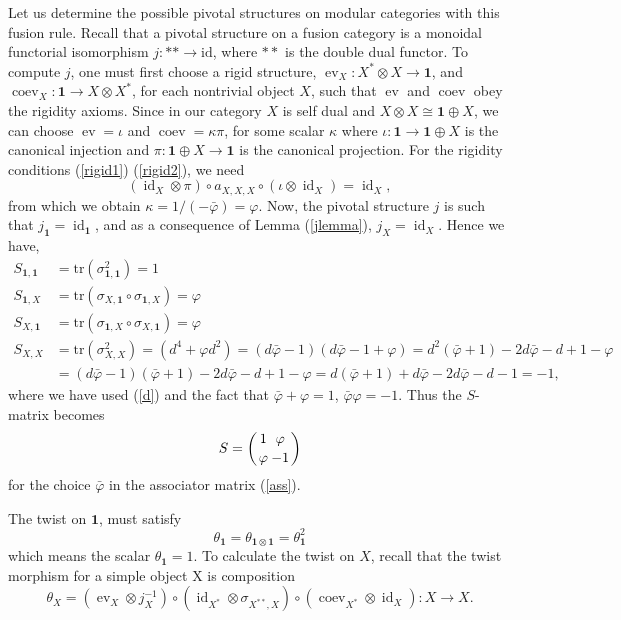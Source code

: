 \documentclass[11pt]{book}
\theoremstyle{Rem}
\theoremstyle{definition}
\numberwithin{equation}{section}
\newcommand{\tmt}[4]{\left({#1\atop #3}{#2\atop #4}\right)}
\newcommand\inv{^{-1}}
\newcommand\id{\operatorname{id}}
\newcommand\one{\mathbf{1}}
\newcommand\ev{\operatorname{ev}}
\newcommand\coev{\operatorname{coev}}
\begin{document}
Let us determine the possible pivotal structures on modular categories with this fusion rule. Recall that a pivotal structure on a fusion category is a monoidal functorial isomorphism $j: **\rightarrow\text{id}$, where $**$ is the double dual functor. To compute $j$, one must first choose a rigid structure, $\ev_X:X^*\otimes X\rightarrow \one$, and $\coev_X:\one\rightarrow X\otimes X^*$, for each nontrivial object $X$, such that $\ev$ and $\coev$ obey the rigidity axioms. Since in our category $X$ is self dual and $X\otimes X \cong \one \oplus X$, we can choose $\ev= \iota$ and $\coev=\kappa\pi$, for some scalar $\kappa$ where $\iota:\one\rightarrow\one\oplus X$ is the canonical injection and  $\pi: \one\oplus X\rightarrow \one$ is the canonical projection.
For the rigidity conditions (\ref{rigid1}) (\ref{rigid2}), we need
\begin{equation}
	(\id_X \otimes \pi) \circ a_{X, X, X}\circ(\iota \otimes \id_X) = \id_X,
\end{equation}
from which we obtain $\kappa=1/(-\bar{\varphi}) = \varphi$.
Now, the pivotal structure $j$ is such that $j_\one =\id_\one$, and as a consequence of Lemma (\ref{jlemma}), $j_X = \id_X$. 
Hence we have, \begin{align}
	S_{\one,\one} &= \text{tr}(\sigma^2_{\one, \one})=1\\
	S_{\one, X} &= \text{tr}(\sigma_{X, \one} \circ \sigma_{\one, X} ) = \varphi\\
	S_{X, \one} &= \text{tr}(\sigma_{ \one, X} \circ \sigma_{X, \one} )=\varphi\\
	S_{X, X} &= \text{tr}(\sigma^2_{X,X}) =  (d^4 + \varphi d^2) = (d\bar{\varphi} -1)(d\bar{\varphi} -1 + \varphi) = d^2(\bar{\varphi} +1) -2d\bar{\varphi} -d +1 -\varphi\\&= (d\bar{\varphi} -1)(\bar{\varphi} +1) -2d\bar{\varphi} -d +1 -\varphi = d(\bar{\varphi}+1) + d\bar{\varphi} -2d\bar{\varphi} - d -1 = -1,
\end{align}
where we have used (\ref{d}) and the fact that $\bar{\varphi} + \varphi = 1$, $\bar{\varphi}\varphi =-1$.
Thus the $S$-matrix becomes \begin{equation}
	S = \tmt{1}{\varphi}{\varphi}{-1}
\end{equation}
for the choice $\bar{\varphi}$ in the associator matrix (\ref{ass}).

The twist on $\one$, must satisfy \begin{equation}
	\theta_{\one} =\theta_{\one \otimes \one} = \theta_\one^2
\end{equation} 
which means the scalar $\theta_\one =1$. To calculate the twist on $X$, recall that the twist morphism for a simple object X is composition \begin{equation}
	\theta_X =(\ev_{X} \otimes j_X\inv)\circ(\id_{X^*} \otimes \sigma_{X^{**}, X} )\circ(\coev_{X^*} \otimes \id_X):X\rightarrow X.
\end{equation}
\end{document}
